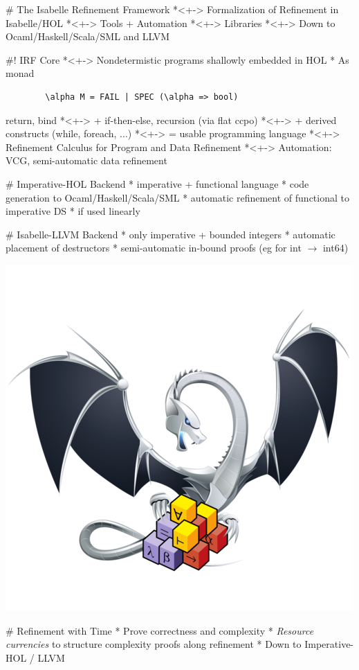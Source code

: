 \documentclass[fleqn]{beamer}
\begin{document}
# The Isabelle Refinement Framework
  *<+-> Formalization of Refinement in Isabelle/HOL
  *<+-> Tools + Automation
  *<+-> Libraries
  *<+-> Down to Ocaml/Haskell/Scala/SML and LLVM

#! IRF Core
  *<+-> Nondetermistic programs shallowly embedded in HOL
    * As monad
      \begin{lstlisting}
        \alpha M = FAIL | SPEC (\alpha => bool)
      \end{lstlisting}
      return, bind
    *<+-> + if-then-else, recursion (via flat ccpo)
    *<+-> + derived constructs (while, foreach, ...)
    *<+-> = usable programming language
  *<+-> Refinement Calculus for Program and Data Refinement
  *<+-> Automation: VCG, semi-automatic data refinement

# Imperative-HOL Backend
  * imperative + functional language
  * code generation to Ocaml/Haskell/Scala/SML
  * automatic refinement of functional to imperative DS
    * if used linearly

# Isabelle-LLVM Backend
  * only imperative + bounded integers
  * automatic placement of destructors
  * semi-automatic in-bound proofs (eg for int $\to$ int64)

  \includegraphics[height=.5\textheight]{isabelle-llvm.png}

# Refinement with Time
  * Prove correctness and complexity
  * \emph{Resource currencies} to structure complexity proofs along refinement
  * Down to Imperative-HOL / LLVM
\end{document}
